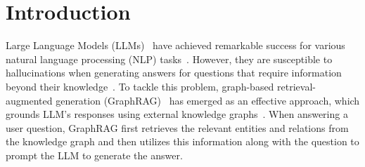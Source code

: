 \section{Introduction}\label{sec:intro}
Large Language Models (LLMs)~\cite{llama2,openai2024gpt4technicalreport,brown2020languagemodelsfewshotlearners} have achieved remarkable success for various natural language processing (NLP) tasks~\cite{multitask, chatbot, translation}. However, they are susceptible to hallucinations when generating answers for questions that require information beyond their knowledge~\cite{hallucination, zhang2023sirenssongaiocean}. To tackle this problem, graph-based retrieval-augmented generation (GraphRAG)~\cite{ms_graphrag} has emerged as an effective approach, which grounds LLM's responses using external knowledge graphs~\cite{ecommerce, finance, social}. When answering a user question, GraphRAG first retrieves the relevant entities and relations from the knowledge graph and then utilizes this information along with the question to prompt the LLM to generate the answer.


